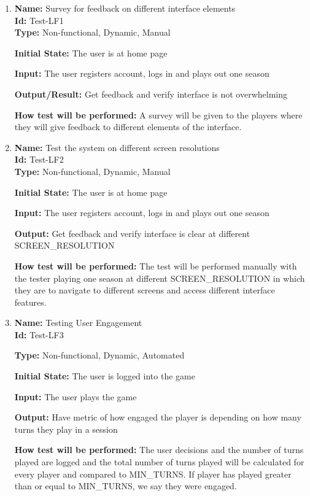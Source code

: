 \documentclass[12pt, titlepage]{article}
\begin{document}
\begin{enumerate}

\item{\textbf{Name:} Survey for feedback on different interface elements\\} \label{Test-LF1}%
\textbf{Id:} Test-LF1\\

\textbf{Type:} Non-functional, Dynamic, Manual
					
\textbf{Initial State: }The user is at home page
					
\textbf{Input:} The user registers account, logs in and plays out one season
					
\textbf{Output/Result:} Get feedback and verify interface is not overwhelming
					
\textbf{How test will be performed:} A survey will be given to the players where they will give feedback to different elements of the interface.
					
\item{\textbf{Name: }Test the system on different screen resolutions \\}\label{Test-LF2}
\textbf{Id: }Test-LF2\\

\textbf{Type: }Non-functional, Dynamic, Manual
					
\textbf{Initial State:} The user is at home page
					
\textbf{Input:} The user registers account, logs in and plays out one season
					
\textbf{Output:} Get feedback and verify interface is clear at different SCREEN\_RESOLUTION %
					
\textbf{How test will be performed:} The test will be performed manually with the tester playing one season at different SCREEN\_RESOLUTION in which they are to navigate to different screens and access different interface features.

\item{\textbf{Name: }Testing User Engagement \\}\label{Test-LF3}
\textbf{Id: }Test-LF3

\textbf{Type:} Non-functional, Dynamic, Automated
					
\textbf{Initial State:} The user is logged into the game
					
\textbf{Input:} The user plays the game
					
\textbf{Output: }Have metric of how engaged the player is depending on how many turns they play in a session
					
\textbf{How test will be performed:} The user decisions and the number of turns played are logged and the total number of turns played will be calculated for every player and compared to MIN\_TURNS. If player has played greater than or equal to MIN\_TURNS, we say they were engaged.


\end{enumerate}
\end{document}
